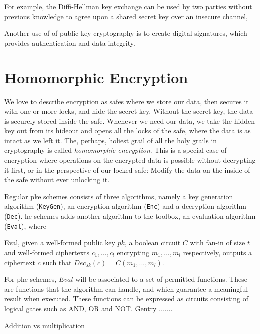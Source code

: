 For example, the Diffi-Hellman key exchange can be used by two parties without previous knowledge to agree upon a shared secret key over an insecure channel, 


Another use of of public key cryptography is to create digital signatures, which provides authentication and data integrity.

\section{Homomorphic Encryption}

We love to describe encryption as safes where we store our data, then secures it with one or more locks, and hide the secret key. Without the secret key, the data is securely stored inside the safe. Whenever we need our data, we take the hidden key out from its hideout and opens all the locks of the safe, where the data is as intact as we left it. The, perhaps, holiest grail of all the holy grails in cryptography is called \emph{homomorphic encryption}. This is a special case of encryption where operations on the encrypted data is possible without decrypting it first, or in the perspective of our locked safe: Modify the data on the inside of the safe without ever unlocking it.

Regular \gls{pke} schemes consists of three algorithms, namely a key generation algorithm (\texttt{KeyGen}), an encryption algorithm (\texttt{Enc}) and a decryption algorithm (\texttt{Dec}). \gls{he} schemes adds another algorithm to the toolbox, an evaluation algorithm (\texttt{Eval}), where

\begin{theorem}

Eval, given a well-formed public key $pk$, a boolean circuit $C$ with fan-in of size $t$ and well-formed ciphertexts $c_1, ... , c_l$ encrypting $m_1, ..., m_l$ respectively, outputs a ciphertext $c$ such that $Dec_{sk}(c) = C(m_1, ..., m_l)$.

\end{theorem}

For \gls{phe} schemes, $Eval$ will be associated to a set of permitted functions. These are functions that the algorithm can handle, and which guarantee a meaningful result when executed. These functions can be expressed as circuits consisting of logical gates such as AND, OR and NOT. Gentry .......

Addition vs multiplication\\


